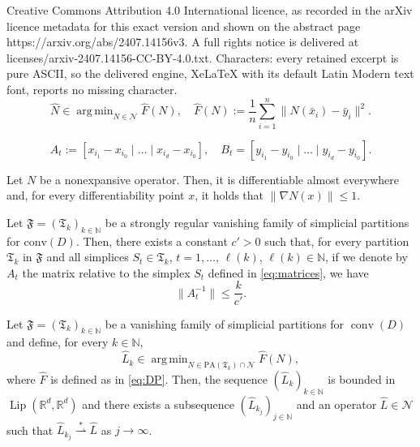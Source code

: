 \documentclass[10pt,a4paper]{amsart}
\DeclareMathOperator*{\argmin}{arg\,min}
\newcommand{\Lip}{\operatorname{Lip}}
\newcommand{\N}{\mathcal{N}}
\newcommand{\R}{\mathbb{R}}
\newcommand{\conv}{\operatorname{conv}}
\newcommand{\weakk}{\stackrel{\ast}{\rightharpoonup}}
\begin{document}
Creative Commons Attribution 4.0 International licence, as recorded in the arXiv licence metadata for this exact version and shown on the abstract page https://arxiv.org/abs/2407.14156v3. A full rights notice is delivered at licenses/arxiv-2407.14156-CC-BY-4.0.txt. Characters: every retained excerpt is pure ASCII, so the delivered engine, XeLaTeX with its default Latin Modern text font, reports no missing character.
\begin{equation}\label{eq:DP}
\tag{DP}
\widehat{N}\in \argmin_{N\in\N}\widehat{F}(N), \quad \widehat{F}(N):=\frac{1}{n}\sum_{i=1}^n \|N(\bar{x}_i)-\bar{y}_i\|^2.
\end{equation}

\begin{equation}\label{eq:matrices}
A_t:=[x_{i_1}-x_{i_0}\mid\dots \mid x_{i_d}-x_{i_0}], \quad B_t=[y_{i_1}-y_{i_0}\mid\ldots \mid y_{i_d}-y_{i_0}].
\end{equation}

\begin{prop}\label{prop:aediff}
Let $N$ be a nonexpansive operator. Then, it is differentiable almost everywhere and, for every differentiability point $x$, it holds that $\|\nabla N(x)\|\leq 1$.
\end{prop}

\begin{lemma}\label{lem:bound_invA} Let $\mathfrak{F}=(\mathfrak{T}_k)_{k\in\mathbb{N}}$ be a strongly regular vanishing family of simplicial partitions for $\mathrm{conv}(D)$. Then, there exists a constant $c'>0$ such that, for every partition $\mathfrak{T}_k$ in $\mathfrak{F}$ and all simplices $S_t\in \mathfrak{T}_k$, $t=1,\ldots, \, \ell(k)$, $\ell(k)\in\mathbb{N}$, if we denote by $A_t$ the matrix  relative to the simplex $S_t$ defined in \cref{eq:matrices}, we have
$$
\|A_t^{-1}\|\leq \frac{k}{c'}.
$$
\end{lemma}

\begin{lemma}\label{lem:311}
Let $\mathfrak{F}=(\mathfrak{T}_k)_{k\in\mathbb{N}}$ be a vanishing family of simplicial partitions for $\conv(D)$ and define, for every $k\in\mathbb{N}$,
\begin{equation}\label{eq:Lk*bounded}
\widehat{L}_k\in\argmin_{N\in \mathrm{PA}(\mathfrak{T}_k)\cap\mathcal{N}}\widehat{F}(N),
\end{equation}
where $\widehat{F}$ is defined as in \cref{eq:DP}. Then, the sequence $(\widehat{L}_k)_{k\in\mathbb{N}}$ is bounded in $\Lip(\R^d, \R^d)$ and there exists a subsequence $(\widehat{L}_{k_j})_{j\in\mathbb{N}}$ and an operator $\widehat{L}\in \mathcal{N}$ such that $\widehat{L}_{k_j}\weakk \widehat{L}$ as $j \to \infty$.
\end{lemma}
\end{document}
